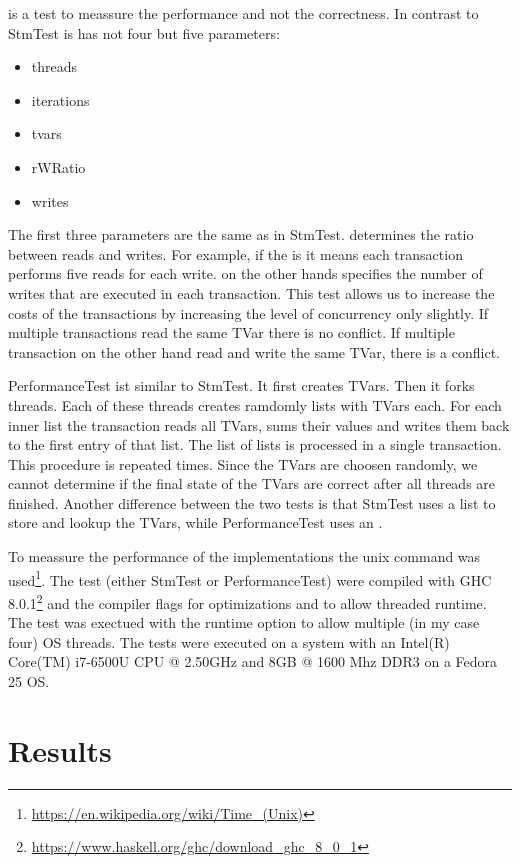  is a test to meassure the performance and not the correctness. In contrast to StmTest is has not four but
five parameters:
\begin{itemize}
 \item threads
 \item iterations
 \item tvars
 \item rWRatio
 \item writes
\end{itemize}
The first three parameters are the same as in StmTest.  determines the ratio between reads and writes. For example, if
the  is  it means each transaction performs five reads for each write.  on the other hands specifies
the number of writes that are executed in each transaction. This test allows us to increase the costs of the transactions by 
increasing the level of concurrency only slightly. If multiple transactions read the same TVar there is no conflict. If multiple
transaction on the other hand read and write the same TVar, there is a conflict. 

PerformanceTest ist similar to StmTest. It first creates  TVars. Then it forks  threads. Each of these 
threads creates ramdomly  lists with  TVars each. For each inner list the transaction reads all TVars,
sums their values and writes them back to the first entry of that list. The list of lists is processed in a single transaction. 
This procedure is repeated  times. Since the TVars are choosen randomly, we cannot determine if the final state
of the TVars are correct after all threads are finished. Another difference between the two tests is that StmTest uses a list to 
store and lookup the TVars, while PerformanceTest uses an .

To meassure the performance of the implementations the unix  command was used\footnote{\url{https://en.wikipedia.org/wiki/Time_(Unix)}}.
The test (either StmTest or PerformanceTest) were compiled with GHC 8.0.1\footnote{\url{https://www.haskell.org/ghc/download_ghc_8_0_1}} and the 
compiler flags  for optimizations and  to allow threaded runtime. The test was exectued with the runtime option  
to allow multiple (in my case four) OS threads. The tests were executed on a system with an Intel(R) Core(TM) i7-6500U CPU @ 2.50GHz and 
8GB @ 1600 Mhz DDR3 on a Fedora 25 OS. 


\section{Results}